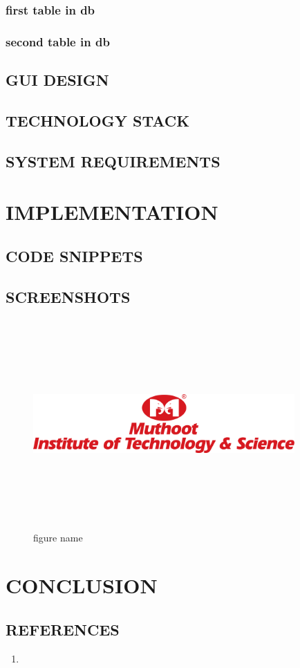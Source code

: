 \documentclass[a4paper,12pt]{report}
\begin{document}
\subsection{first table in db}

\subsection{second table in db}




\section{GUI DESIGN}

\section{TECHNOLOGY STACK}

\section{SYSTEM REQUIREMENTS}


\chapter{IMPLEMENTATION}

\section{CODE SNIPPETS}
\noindent

\newpage

\section{SCREENSHOTS}
\renewcommand\thefigure{\thechapter.\arabic{figure}}
\begin{figure}[hbtp]
    \centering
    \includegraphics[height=8cm,width=10cm]{images/MITS.png}
    \caption{figure name}
    \label{fig1}
\end{figure}
\chapter{CONCLUSION}

\newpage




\section{REFERENCES}
\begin{enumerate}
    \item

\end{enumerate}
\end{document}
